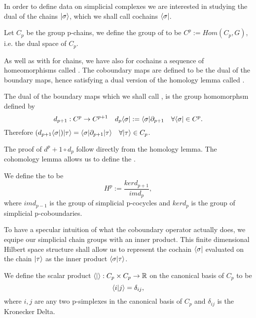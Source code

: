\documentclass[../1.tex]{subfiles}
\begin{document}
    In order to define data on simplicial complexes we are interested in studying the dual of the chains $| \sigma \rangle$,
    which we shall call cochains $\langle \sigma |$.
       
    \begin{defn}
        Let $C_p$ be the group p-chains, we define the group of  to 
        be $C^p := Hom(C_p, G)$, i.e. the dual space of $C_p$.
    \end{defn}

    As well as with for chains, we have also for cochains a sequence of homeomorphisms called . The coboundary maps are defined
    to be the dual of the boundary maps, hence satisfying a dual version of the homology lemma called .

    \begin{defn}
        The dual of the boundary maps which we shall call
        , is the group homomorphsm defined by
        \[ d_{p+1} : C^p \to C^{p+1} \quad d_p\langle \sigma | := \langle \sigma | \partial_{p+1} \quad \forall \langle \sigma | \in C^p.\]
        Therefore $(d_{p+1}\langle \sigma |)| \tau \rangle = \langle \sigma | \partial_{p+1} | \tau \rangle \quad \forall | \tau \rangle \in C_p$.
    \end{defn}

    The proof of $d^p+1 \circ d_p$ follow directly from the homology lemma. The cohomology lemma allows us to define the .
    
    \begin{defn}
        We define the  to be 
        \[H^p := \frac{ker d_{p+1}}{im d_{p}},\] 
        where $im d_{p-1}$ is the group of simplicial p-cocycles and
        $ker d_p$ is the group of simplicial p-coboundaries.
    \end{defn}

    To have a specular intuition of what the coboundary operator actually does, we equipe our simplicial chain groups with
    an inner product. This finite dimensional Hilbert space structure shall allow us to represent the cochain $\langle \sigma |$ evaluated on the chain $| \tau \rangle$ 
    as the inner product $\langle \sigma | \tau \rangle$.

    \begin{defn}
        We define the scalar product $\langle  |  \rangle : C_p \times C_p \to \mathbb{R}$ on the canonical basis of $C_p$ to be 
        \[ \langle i | j \rangle = \delta_{ij} ,\]  
        where $i,j$ are any two p-simplexes in the canonical basis of $C_p$ and $\delta_{ij}$ is the Kronecker Delta.
    \end{defn}
\end{document}
